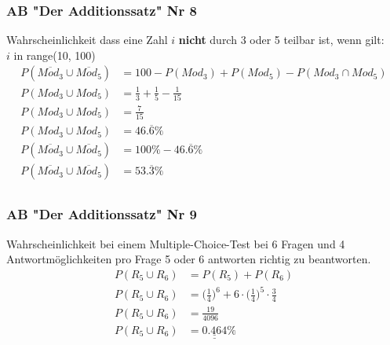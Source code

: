 \documentclass[a4paper,12pt]{article}
\begin{document}
\subsubsection*{AB "Der Additionssatz" Nr 8}
Wahrscheinlichkeit dass eine Zahl $i$ \textbf{nicht} durch 3 oder 5 teilbar ist, wenn gilt:\\
$i$ in range(10, 100)\\
\begin{equation*}
\begin{split}
P(\overline{Mod_3} \cup \overline{Mod_5}) & = 100 - P(Mod_3) + P(Mod_5) - P(Mod_3 \cap Mod_5)\\
P(Mod_3 \cup Mod_5) & = \frac{1}{3} + \frac{1}{5} - \frac{1}{15}\\
P(Mod_3 \cup Mod_5) & = \frac{7}{15}\\
P(Mod_3 \cup Mod_5) & = 46.\overline{6} \%\\
P(\overline{Mod_3} \cup \overline{Mod_5}) & = 100 \% - 46.\overline{6} \%\\
P(\overline{Mod_3} \cup \overline{Mod_5}) & = 53.\overline{3} \%\\
\end{split}
\end{equation*}
\subsubsection*{AB "Der Additionssatz" Nr 9}
Wahrscheinlichkeit bei einem Multiple-Choice-Test bei 6 Fragen und 4 Antwortmöglichkeiten pro Frage 5 oder 6 antworten richtig zu beantworten.\\
\begin{equation*}
\begin{split}
P(R_5 \cup R_6) & = P(R_5) + P(R_6)\\
P(R_5 \cup R_6) & = \Big(\frac{1}{4}\Big)^6 + 6 \cdot \Big(\frac{1}{4}\Big)^5 \cdot \frac{3}{4}\\
P(R_5 \cup R_6) & = \frac{19}{4096}\\
P(R_5 \cup R_6) & = \underline{\underline{0.464}} \%\\
\end{split}
\end{equation*}
\pagebreak
\end{document}
